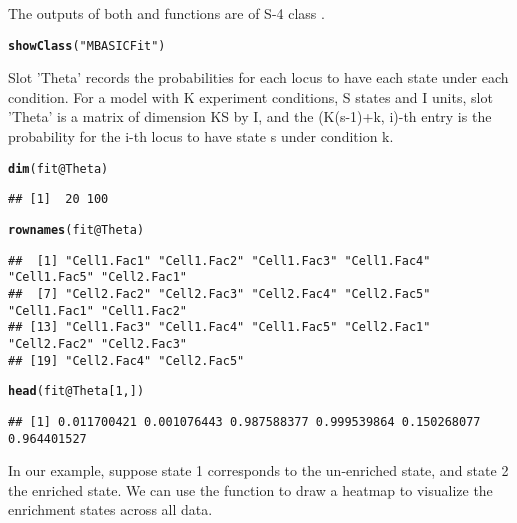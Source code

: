 \documentclass[a4paper,10pt]{article}\usepackage[]{graphicx}\usepackage[]{color}
\makeatletter
\newcommand{\hlnum}[1]{\textcolor[rgb]{0.686,0.059,0.569}{#1}}%
\newcommand{\hlstr}[1]{\textcolor[rgb]{0.192,0.494,0.8}{#1}}%
\newcommand{\hlopt}[1]{\textcolor[rgb]{0,0,0}{#1}}%
\newcommand{\hlstd}[1]{\textcolor[rgb]{0.345,0.345,0.345}{#1}}%
\newcommand{\hlkwc}[1]{\textcolor[rgb]{0.333,0.667,0.333}{#1}}%
\newcommand{\hlkwd}[1]{\textcolor[rgb]{0.737,0.353,0.396}{\textbf{#1}}}%
\newenvironment{kframe}{%
 \def\at@end@of@kframe{}%
 \ifinner\ifhmode%
  \def\at@end@of@kframe{\end{minipage}}%
  \begin{minipage}{\columnwidth}%
 \fi\fi%
 \def\FrameCommand##1{\hskip\@totalleftmargin \hskip-\fboxsep
 \colorbox{shadecolor}{##1}\hskip-\fboxsep
     \hskip-\linewidth \hskip-\@totalleftmargin \hskip\columnwidth}%
 \MakeFramed {\advance\hsize-\width
   \@totalleftmargin\z@ \linewidth\hsize
   \@setminipage}}%
 {\par\unskip\endMakeFramed%
 \at@end@of@kframe}
\newenvironment{knitrout}{}{} %
\makeatother
\begin{document}
The outputs of both  and  functions are of S-4 class .

\begin{knitrout}
\color{fgcolor}\begin{kframe}
\begin{alltt}
\hlkwd{showClass}\hlstd{(}\hlstr{"MBASICFit"}\hlstd{)}
\end{alltt}
\end{kframe}
\end{knitrout}

Slot 'Theta' records the probabilities for each locus to have each state under each condition. For a model with K experiment conditions, S states and I units, slot 'Theta' is a matrix of dimension KS by I, and the (K(s-1)+k, i)-th entry is the probability for the i-th locus to have state s under condition k. 

\begin{knitrout}
\color{fgcolor}\begin{kframe}
\begin{alltt}
\hlkwd{dim}\hlstd{(fit}\hlopt{@}\hlkwc{Theta}\hlstd{)}
\end{alltt}
\begin{verbatim}
## [1]  20 100
\end{verbatim}
\begin{alltt}
\hlkwd{rownames}\hlstd{(fit}\hlopt{@}\hlkwc{Theta}\hlstd{)}
\end{alltt}
\begin{verbatim}
##  [1] "Cell1.Fac1" "Cell1.Fac2" "Cell1.Fac3" "Cell1.Fac4" "Cell1.Fac5" "Cell2.Fac1"
##  [7] "Cell2.Fac2" "Cell2.Fac3" "Cell2.Fac4" "Cell2.Fac5" "Cell1.Fac1" "Cell1.Fac2"
## [13] "Cell1.Fac3" "Cell1.Fac4" "Cell1.Fac5" "Cell2.Fac1" "Cell2.Fac2" "Cell2.Fac3"
## [19] "Cell2.Fac4" "Cell2.Fac5"
\end{verbatim}
\begin{alltt}
\hlkwd{head}\hlstd{(fit}\hlopt{@}\hlkwc{Theta}\hlstd{[}\hlnum{1}\hlstd{, ])}
\end{alltt}
\begin{verbatim}
## [1] 0.011700421 0.001076443 0.987588377 0.999539864 0.150268077 0.964401527
\end{verbatim}
\end{kframe}
\end{knitrout}

In our example, suppose state 1 corresponds to the un-enriched state, and state 2 the enriched state. We can use the function  to draw a heatmap to visualize the enrichment states across all data.
\end{document}
